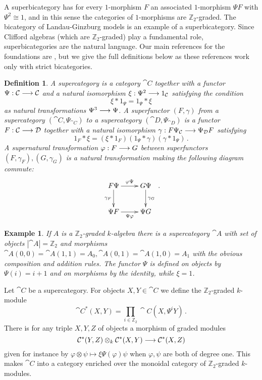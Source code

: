 \documentclass[english,letter paper,12pt,leqno]{article}
\theoremstyle{example}
\newtheorem{definition}[theorem]{Definition}
\newtheorem{example}[theorem]{Example}
\numberwithin{equation}{section}
\begin{document}
A superbicategory has for every $1$-morphism $F$ an associated $1$-morphism $\Psi F$ with $\Psi^2 \cong 1$, and in this sense the categories of $1$-morphisms are $\mathbb{Z}_2$-graded. The bicategory of Landau-Ginzburg models is an example of a superbicategory. Since Clifford algebras (which are $\mathbb{Z}_2$-graded) play a fundamental role, superbicategories are the natural language. Our main references for the foundations are \cite{ellis_lauda,kang,kang2}, but we give the full definitions below as these references work only with strict bicategories.

\begin{definition} A \emph{supercategory} is a category $\cat{C}$ together with a functor $\Psi: \mathcal{C} \longrightarrow \mathcal{C}$ and a natural isomorphism $\xi: \Psi^2 \longrightarrow 1_{\mathcal{C}}$ satisfying the condition
\[
\xi * 1_{\Psi} = 1_{\Psi} * \xi
\]
as natural transformations $\Psi^3 \longrightarrow \Psi$. A \emph{superfunctor} $(F, \gamma)$ from a supercategory $(\cat{C}, \Psi_{\cat{C}})$ to a supercategory $(\cat{D}, \Psi_{\cat{D}})$ is a functor $F: \mathcal{C} \longrightarrow \mathcal{D}$ together with a natural isomorphism $\gamma: F \Psi_{\mathcal{C}} \longrightarrow \Psi_{\mathcal{D}} F$ satisfying
\[
1_F * \xi = (\xi * 1_F ) ( 1_{\Psi} * \gamma ) ( \gamma * 1_{\Psi} )\,.
\]
A \emph{supernatural transformation} $\varphi: F \longrightarrow G$ between superfunctors $(F,\gamma_F), (G,\gamma_G)$ is a natural transformation making the following diagram commute:
\[
\xymatrix{
F \Psi \ar[r]^-{\varphi \Psi}\ar[d]_-{\gamma_F} & G \Psi \ar[d]^-{\gamma_G}\\
\Psi F \ar[r]_-{\Psi \varphi} & \Psi G
}\,.
\] 
\end{definition}

\begin{example}\label{example:Aassup} If $A$ is a $\mathbb{Z}_2$-graded $k$-algebra there is a supercategory $\cat{A}$ with set of objects $|\cat{A}| = \mathbb{Z}_2$ and morphisms $\cat{A}(0,0) = \cat{A}(1,1) = A_0, \cat{A}(0,1) = \cat{A}(1,0) = A_1$ with the obvious composition and addition rules. The functor $\Psi$ is defined on objects by $\Psi(i) = i+1$ and on morphisms by the identity, while $\xi = 1$.
\end{example}

Let $\cat{C}$ be a supercategory. For objects $X,Y \in \cat{C}$ we define the $\mathbb{Z}_2$-graded $k$-module
\[
\cat{C}^*(X,Y) = \prod_{i \in \mathbb{Z}_2} \cat{C}(X, \Psi^i Y)\,.
\]
There is for any triple $X,Y,Z$ of objects a morphism of graded modules
\[
\mathcal{C}^*(Y,Z) \otimes_k \mathcal{C}^*(X, Y) \longrightarrow \mathcal{C}^*(X,Z)
\]
given for instance by $\varphi \otimes \psi \mapsto \xi \Psi( \varphi ) \psi$ when $\varphi, \psi$ are both of degree one. This makes $\cat{C}$ into a category enriched over the monoidal category of $\mathbb{Z}_2$-graded $k$-modules.
\end{document}
